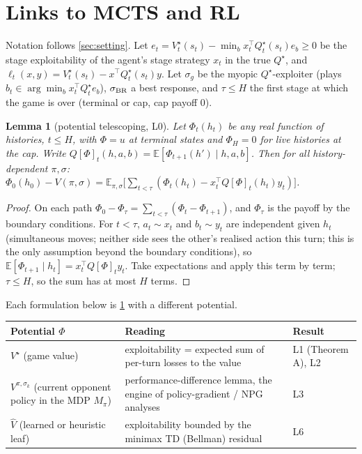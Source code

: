 \documentclass[10pt]{article}
\theoremstyle{plain}
\newtheorem{lemma}[theorem]{Lemma}
\theoremstyle{definition}
\theoremstyle{remark}
\newcommand{\E}{\mathbb{E}}
\begin{document}
\section{Links to MCTS and RL}
\label{sec:links}
Notation follows \cref{sec:setting}. Let $e_t=V^\star_t(s_t)-\min_bx_t^\top Q^\star_t(s_t)e_b\ge0$ be the stage exploitability of the agent's stage strategy $x_t$ in the true $Q^\star$, and $\ell_t(x,y)=V^\star_t(s_t)-x^\top Q^\star_t(s_t)y$. Let $\sigma_g$ be the myopic $Q^\star$-exploiter (plays $b_t\in\arg\min_bx_t^\top Q^\star_te_b$), $\sigma_{\rm BR}$ a best response, and $\tau\le H$ the first stage at which the game is over (terminal or cap, cap payoff $0$).

\begin{lemma}[potential telescoping, L0]\label{lem:L0}
Let $\Phi_t(h_t)$ be any real function of histories, $t\le H$, with $\Phi=u$ at terminal states and $\Phi_H=0$ for live histories at the cap. Write $Q[\Phi]_t(h,a,b)=\E[\Phi_{t+1}(h')\mid h,a,b]$. Then for all history-dependent $\pi,\sigma$: $\Phi_0(h_0)-V(\pi,\sigma)=\E_{\pi,\sigma}\big[\sum_{t<\tau}(\Phi_t(h_t)-x_t^\top Q[\Phi]_t(h_t)y_t)\big]$.
\end{lemma}
\begin{proof}
On each path $\Phi_0-\Phi_\tau=\sum_{t<\tau}(\Phi_t-\Phi_{t+1})$, and $\Phi_\tau$ is the payoff by the boundary conditions. For $t<\tau$, $a_t\sim x_t$ and $b_t\sim y_t$ are independent given $h_t$ (simultaneous moves; neither side sees the other's realised action this turn; this is the only assumption beyond the boundary conditions), so $\E[\Phi_{t+1}\mid h_t]=x_t^\top Q[\Phi]_ty_t$. Take expectations and apply this term by term; $\tau\le H$, so the sum has at most $H$ terms.
\end{proof}
Each formulation below is \cref{lem:L0} with a different potential.
\begin{center}\small
\begin{tabular}{@{}p{3.6cm}p{9.2cm}p{2.6cm}@{}}
\toprule
Potential $\Phi$ & Reading & Result \\
\midrule
$V^\star$ (game value) & exploitability = expected sum of per-turn losses to the value & L1 (Theorem A), L2 \\
$V^{\pi,\sigma_k}$ (current opponent policy in the MDP $M_\pi$) & performance-difference lemma, the engine of policy-gradient / NPG analyses & L3 \\
$\hat V$ (learned or heuristic leaf) & exploitability bounded by the minimax TD (Bellman) residual & L6 \\
\bottomrule
\end{tabular}
\end{center}
\end{document}
